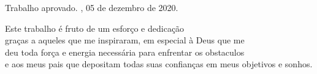 \documentclass[
	12pt,				%
	openright,			%
	oneside,			%
	a4paper,			%
	english,			%
	french,				%
	spanish,			%
	brazil,				%
	]{abntex2}
\begin{document}
%
% 
%
\begin{folhadeaprovacao}

  \begin{center}
    {\ABNTEXchapterfont\large\imprimirautor}

    \vspace*{\fill}\vspace*{\fill}
    {\ABNTEXchapterfont\bfseries\Large\imprimirtitulo}
    \vspace*{\fill}
    
    \hspace{.45\textwidth}
    \begin{minipage}{.5\textwidth}
        \imprimirpreambulo
    \end{minipage}%
    \vspace*{\fill}
   \end{center}
    
   Trabalho aprovado. \imprimirlocal, 05 de dezembro de 2020.

      
   \begin{center}
    \vspace*{0.5cm}
    {\large\imprimirlocal}
    \par
    {\large\imprimirdata}
    \vspace*{1cm}
  \end{center}
  
\end{folhadeaprovacao}


\begin{dedicatoria}
   \vspace*{\fill}
	\begin{flushright}
        Este trabalho é fruto de um esforço e dedicação\\ 
       graças a aqueles que me inspiraram, em especial à Deus que me\\ 
    deu toda força e energia necessária para enfrentar os obstaculos \\
    e aos meus pais que depositam todas suas confianças em meus objetivos e sonhos.
    \end{flushright}
\end{dedicatoria}
\end{document}
